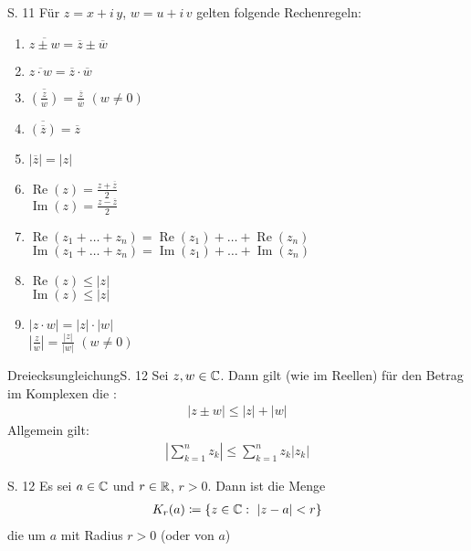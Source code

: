 \begin{satz}[Rechenregeln]{S. 11}
  Für $z = x + i \, y$, $w = u + i \, v$ gelten folgende Rechenregeln:
  \begin{enumerate}
    \item $\displaystyle \overline{z \pm w} = \overline{z} \pm \overline{w}$
    \item $\displaystyle \overline{z \cdot w} = \overline{z} \cdot \overline{w}$
    \item $\displaystyle \overline{\left( \frac{z}{w} \right)} = \frac{\overline{z}}{\overline{w}}$ $(w \neq 0)$
    \item $\displaystyle \overline{\left( \overline{z} \right)} = \overline{z}$
    \item $\displaystyle \left| \overline{z} \right| = \left| z \right|$
    \item $\displaystyle \operatorname{Re}(z) = \frac{z + \overline{z}}{2}$\\
      $\displaystyle \operatorname{Im}(z) = \frac{z - \overline{z}}{2}$
    \item $\displaystyle \operatorname{Re}(z_1 + \dots + z_n) = \operatorname{Re}(z_1) + \dots + \operatorname{Re}(z_n)$\\
      $\displaystyle \operatorname{Im}(z_1 + \dots + z_n) = \operatorname{Im}(z_1) + \dots + \operatorname{Im}(z_n)$
    \item $\displaystyle \operatorname{Re}(z) \leq |z|$\\
      $\displaystyle \operatorname{Im}(z) \leq |z|$
    \item $\displaystyle | z \cdot w | = |z| \cdot |w|$\\
      $\displaystyle \left| \frac{z}{w} \right| = \frac{|z|}{|w|}$ $(w \neq 0)$
  \end{enumerate}
\end{satz}

\begin{bemerkung}{Dreiecksungleichung}{S. 12}
  Sei $z, w \in \mathbb{C}$.
  Dann gilt (wie im Reellen) für den Betrag im Komplexen die :
  \begin{align}
    | z \pm w | \leq |z| + |w|
  \end{align}
  Allgemein gilt:
  \begin{align}
    \left| \sum_{k=1}^n z_k \right| \leq \sum_{k=1}^n z_k \left| z_k \right|
  \end{align}
\end{bemerkung}

\begin{definition}{S. 12}
  \label{def:1_2}
  Es sei $a \in \mathbb{C}$ und $r \in \mathbb{R}$, $r > 0$.
  Dann ist die Menge
  \begin{align}
    K_r (a) \coloneqq \{ z \in \mathbb{C} : \ |z-a| < r \}
  \end{align}
  die  um $a$ mit Radius $r>0$ (oder  von $a$)
\end{definition}

